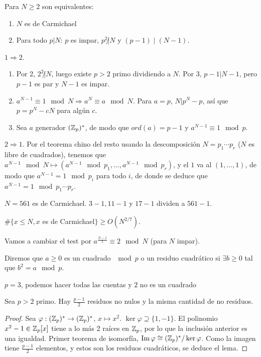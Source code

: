 \documentclass[CR.tex]{subfiles}
\begin{document}
\begin{prop}
Para $N\geq 2$ son equivalentes:
\begin{enumerate}
\item $N$ es de Carmichael
\item Para todo $p|N$: $p$ es impar, $p^2\not| N$ y $(p-1)\mid (N-1)$. 
\end{enumerate}
\end{prop}
\begin{dem}
$1\Rightarrow 2$. 
\begin{enumerate}
\item Por 2, $2^2\not| N$, luego existe $p>2$ primo dividiendo a $N$.  Por 3, $p-1|N-1$, pero $p-1$ es par y $N-1$ es impar. 
\item $a^{N-1}\equiv 1\mod N\Rightarrow a^N\equiv a\mod N$. Para $a=p$, $N| p^N-p$, así que $p=p^N-cN$ para algún $c$.
\item Sea $a$ generador $(\mathbb{Z}_p)^*$, de modo que $ord(a)=p-1$ y $a^{N-1}\equiv 1\mod p$. 
\end{enumerate}

$2\Rightarrow 1$. Por el teorema chino del resto usando la descomposición $N=p_1\cdots p_r$ ($N$ es libre de cuadrados), tenemos que $a^{N-1}\mod N\mapsto (a^{N-1}\mod p_1,\dots, a^{N-1}\mod p_r)$, y el $1$ va al $(1,\dots, 1)$, de modo que $a^{N-1}=1\mod p_i$ para todo $i$, de donde se deduce que $a^{N-1}=1\mod p_1\cdots p_r$. 
\end{dem}

\begin{ej}
$N=561$ es de Carmichael. $3-1,11-1$ y $17-1$ dividen a $561-1$. 
\end{ej}

\begin{prop}
$\#\{x\leq N, x$ es de Carmichael$\}\geq O(N^{2/7})$.
\end{prop}

Vamos a cambiar el test por $a^{\frac{N-1}{2}}\equiv 2\mod N$ (para $N$ impar). 

\begin{defi}
Diremos que $a\geq 0$ es un cuadrado $\mod p$ o un residuo cuadrático si $\exists b\geq 0$ tal que $b^2=a\mod p$.
\end{defi}

\begin{ej}
$p=3$, podemos hacer todas las cuentas y $2$ no es un cuadrado
\end{ej}

\begin{lemma}
Sea $p>2$ primo. Hay $\frac{p-1}{2}$ residuos no nulos  y la misma cantidad de no residuos. 
\end{lemma}
\begin{proof}
Sea $\varphi:(\mathbb{Z}_p)^*\to(\mathbb{Z}_p)^*$, $x\mapsto x^2$. $\ker\varphi\supseteq \{1,-1\}$. El polinomio $x^2-1\in\mathbb{Z}_p[x]$ tiene a lo más 2 raíces en $\mathbb{Z}_p$, por lo que la inclusión anterior es una igualdad. Primer teorema de isomorfía, $\operatorname{Im}\varphi\cong (\mathbb{Z}_p)^*/\ker\varphi$. Como la imagen tiene $\frac{p-1}{2}$ elementos, y estos son los residuos cuadráticos, se deduce el lema. 
\end{proof}
\end{document}
